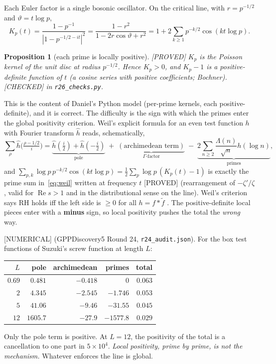 \documentclass[11pt,a4paper]{article}
\theoremstyle{plain}
\newtheorem{proposition}[theorem]{Proposition}
\theoremstyle{definition}
\theoremstyle{remark}
\newcommand{\lab}[1]{\textsf{\small[#1]}}
\newcommand{\PROVED}{\lab{PROVED}}
\newcommand{\CHECKED}{\lab{CHECKED}}
\newcommand{\NUMERICAL}{\lab{NUMERICAL}}
\renewcommand{\Re}{\operatorname{Re}}
\begin{document}
Each Euler factor is a single bosonic oscillator. On the critical line,
with $r=p^{-1/2}$ and $\vartheta=t\log p$,
\begin{equation}\label{eq:poisson}
K_p(t)=\frac{1-p^{-1}}{|1-p^{-1/2-it}|^2}
=\frac{1-r^2}{1-2r\cos\vartheta+r^2}
=1+2\sum_{k\ge1}p^{-k/2}\cos(kt\log p).
\end{equation}
\begin{proposition}[each prime is locally positive]\label{prop:local}
\PROVED{} $K_p$ is the Poisson kernel of the unit disc at radius
$p^{-1/2}$. Hence $K_p>0$, and $K_p-1$ is a positive-definite function of
$t$ (a cosine series with positive coefficients; Bochner). \CHECKED{} in
\texttt{r26\_checks.py}.
\end{proposition}
\noindent
This is the content of Daniel's Python model (per-prime kernels, each
positive-definite), and it is correct. The difficulty is the sign with
which the primes enter the global positivity criterion. Weil's explicit
formula \cite{Weil1952,Bombieri2000} for an even test function $h$ with
Fourier transform $\hat h$ reads, schematically,
\begin{equation}\label{eq:weil}
\sum_{\rho}\hat h\bigl(\tfrac{\rho-1/2}{i}\bigr)
=\underbrace{\hat h(\tfrac i2)+\hat h(-\tfrac i2)}_{\text{pole}}
\;+\;\underbrace{(\text{archimedean term})}_{\Gamma\text{-factor}}
\;-\;\underbrace{2\sum_{n\ge2}\frac{\Lambda(n)}{\sqrt n}h(\log n)}_{\text{primes}},
\end{equation}
and $\sum_{p,k}\log p\,p^{-k/2}\cos(kt\log p)=\tfrac12\sum_p\log p\,(K_p(t)-1)$
is exactly the prime sum in~\eqref{eq:weil} written at frequency $t$
\PROVED{} (rearrangement of $-\zeta'/\zeta$, valid for $\Re s>1$ and in the
distributional sense on the line). Weil's criterion says RH holds iff the
left side is $\ge0$ for all $h=f*\tilde f$ \cite{Weil1952,Bombieri2000}.
The positive-definite local pieces enter with a \textbf{minus} sign, so local
positivity pushes the total the \emph{wrong} way.

\NUMERICAL{} (GPPDiscovery5 Round 24, \texttt{r24\_audit.json}). For the box
test functions of Suzuki's screw function \cite{Suzuki2022} at length $L$:
\begin{center}
\begin{tabular}{rrrrr}
\toprule
$L$ & pole & archimedean & primes & total\\
\midrule
$0.69$ & $0.481$ & $-0.418$ & $0$ & $0.063$\\
$2$ & $4.345$ & $-2.545$ & $-1.746$ & $0.053$\\
$5$ & $41.06$ & $-9.46$ & $-31.55$ & $0.045$\\
$12$ & $1605.7$ & $-27.9$ & $-1577.8$ & $0.029$\\
\bottomrule
\end{tabular}
\end{center}
Only the pole term is positive. At $L=12$, the positivity of the total is a
cancellation to one part in $5\times10^4$. \emph{Local positivity, prime by
prime, is not the mechanism.} Whatever enforces the line is global.
\end{document}
